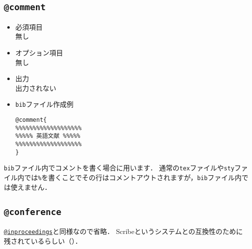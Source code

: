 \documentclass[a4paper,fleqn,uplatex,dvipdfmx]{jsarticle}
\begin{document}
\subsection{\texttt{@comment}}
\label{ssec:comment}
\begin{screen}
    \begin{itemize}
        \item 必須項目 \\
        無し
        \item オプション項目 \\
        無し
        \item 出力 \\
        出力されない
        \item \verb|bib|ファイル作成例 \vspace{-3mm}
\begin{verbatim}
@comment{
%%%%%%%%%%%%%%%%%%%
%%%%% 英語文献 %%%%%
%%%%%%%%%%%%%%%%%%%
}
\end{verbatim}
    \end{itemize}
\end{screen}

\verb|bib|ファイル内でコメントを書く場合に用います．
通常の\verb|tex|ファイルや\verb|sty|ファイル内では\verb|%|を書くことでその行はコメントアウトされますが，\verb|bib|ファイル内では使えません．


\subsection{\texttt{@conference}}
\label{ssec:conference}
\hyperref[ssec:inproceedings]{\texttt{@inproceedings}}と同様なので省略．
Scribeというシステムとの互換性のために残されているらしい（\citealp{奥村:技評2020}）．
\end{document}
